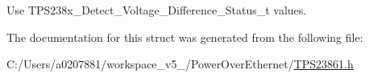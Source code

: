 Use T\-P\-S238x\-\_\-\-Detect\-\_\-\-Voltage\-\_\-\-Difference\-\_\-\-Status\-\_\-t values. 



The documentation for this struct was generated from the following file\-:\begin{DoxyCompactItemize}
\item 
C\-:/\-Users/a0207881/workspace\-\_\-v5\-\_/\-Power\-Over\-Ethernet/\hyperlink{_t_p_s23861_8h}{T\-P\-S23861.\-h}\end{DoxyCompactItemize}
